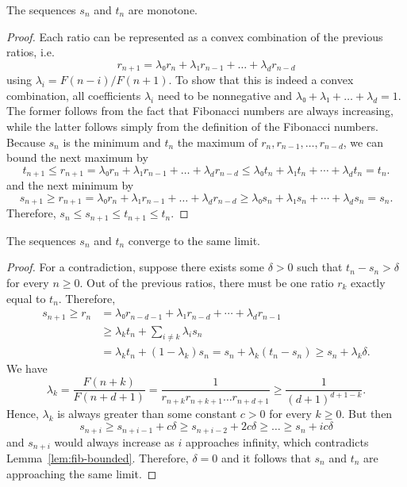 \begin{lemma}
  The sequences $s_n$ and $t_n$ are monotone.
\end{lemma}

\begin{proof}
  Each ratio can be represented as a convex combination of the previous ratios, i.e.
  \[
    r_{n+1} = λ₀ r_n + λ₁ r_{n-1} + \dots + λ_d r_{n-d}
  \]
  using $λ_i = F(n - i) / F(n + 1)$.
  To show that this is indeed a convex combination, all coefficients $λ_i$
  need to be nonnegative and $λ₀ + λ₁ + \dots + \lambda_d = 1$.
  The former follows from the fact that Fibonacci numbers are always increasing,
  while the latter follows simply from the definition of the Fibonacci numbers.
  Because $s_n$ is the minimum and $t_n$ the maximum of $r_n, r_{n-1}, …, r_{n-d}$,
  we can bound the next maximum by
  \[
    t_{n+1} ≤ r_{n+1} = λ₀ r_n + λ₁ r_{n-1} + \dots + λ_d r_{n-d} ≤ λ₀ t_n + λ₁ t_n + ⋯ + λ_d t_n = t_n.
  \]
  and the next minimum by
  \[
    s_{n+1} ≥ r_{n+1} = λ₀ r_n + λ₁ r_{n-1} + \dots + λ_d r_{n-d} ≥ λ₀ s_n + λ₁ s_n + ⋯ + λ_d s_n = s_n.
  \]
  Therefore, $s_n ≤ s_{n+1} ≤ t_{n+1} ≤ t_n$.
\end{proof}

\begin{lemma}
  The sequences $s_n$ and $t_n$ converge to the same limit.
\end{lemma}

\begin{proof}
  For a contradiction, suppose there exists some $δ > 0$ such that $t_n - s_n > δ$ for every $n ≥ 0$.
  Out of the previous ratios, there must be one ratio $r_k$ exactly equal to $t_n$.
  Therefore,
  \begin{align*}
    s_{n+1} ≥ r_n & = λ₀ r_{n-d-1} + λ₁ r_{n-d} + ⋯ + λ_d r_{n-1} \\
                  & ≥ λ_k t_n + \sum_{i ≠ k} λ_i s_n \\
                  & = λ_k t_n + (1 - λ_k) s_n = s_n + λ_k (t_n - s_n) ≥ s_n + λ_k δ.
  \end{align*}
  We have
  \[
    λ_k = \frac{F(n+k)}{F(n+d+1)} = \frac{1}{r_{n+k} r_{n+k+1} \dots r_{n+d+1}} ≥ \frac{1}{(d+1)^{d+1-k}}.
  \]
  Hence, $λ_k$ is always greater than some constant $c > 0$ for every $k ≥ 0$.
  But then
  \[
    s_{n+i} ≥ s_{n+i-1} + c δ ≥ s_{n+i-2} + 2c δ ≥ \dots ≥ s_n + i c δ
  \]
  and $s_{n+i}$ would always increase as $i$ approaches infinity,
  which contradicts Lemma~\ref{lem:fib-bounded}.
  Therefore, $δ = 0$ and it follows that $s_n$ and $t_n$ are approaching the same limit.
\end{proof}

